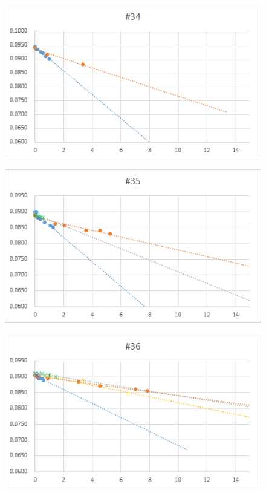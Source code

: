 \documentclass[12pt,a4paper]{jarticle}
\begin{document}
\begin{figure}[htbp]
  \centering
     \includegraphics[width=120mm]{vol_034.png}
\end{figure}
\begin{figure}[htbp]
  \centering
     \includegraphics[width=120mm]{vol_035.png}
\end{figure}
\begin{figure}[htbp]
  \centering
     \includegraphics[width=120mm]{vol_036.png}
\end{figure}
\end{document}
